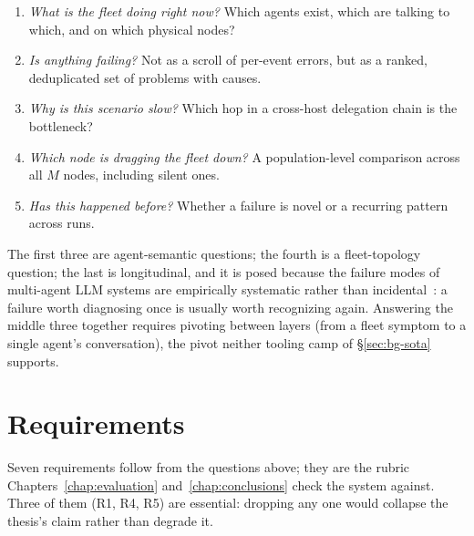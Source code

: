 \begin{enumerate}
\item \emph{What is the fleet doing right now?} Which agents exist,
  which are talking to which, and on which physical nodes?
\item \emph{Is anything failing?} Not as a scroll of per-event
  errors, but as a ranked, deduplicated set of problems with causes.
\item \emph{Why is this scenario slow?} Which hop in a cross-host
  delegation chain is the bottleneck?
\item \emph{Which node is dragging the fleet down?} A
  population-level comparison across all $M$ nodes, including silent
  ones.
\item \emph{Has this happened before?} Whether a failure is novel
  or a recurring pattern across runs.
\end{enumerate}

The first three are agent-semantic questions; the fourth is a
fleet-topology question; the last is longitudinal, and it is posed because
the failure modes of
multi-agent LLM systems are empirically systematic rather than
incidental~\cite{cemri2025mast}: a failure worth diagnosing once is
usually worth recognizing again. Answering the middle three together requires pivoting
between layers (from a fleet symptom to a single agent's
conversation), the pivot neither tooling camp of
\S\ref{sec:bg-sota} supports.

\section{Requirements}
\label{sec:problem-requirements}

Seven requirements follow from the questions above; they are the rubric
Chapters~\ref{chap:evaluation} and~\ref{chap:conclusions} check the system
against. Three of them (R1, R4, R5) are essential: dropping any one would
collapse the thesis's claim rather than degrade it.

